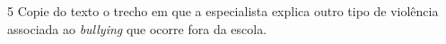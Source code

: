 
\num{5} Copie do texto o trecho em que a especialista explica outro tipo de
violência associada ao \textit{bullying} que ocorre fora da escola.

